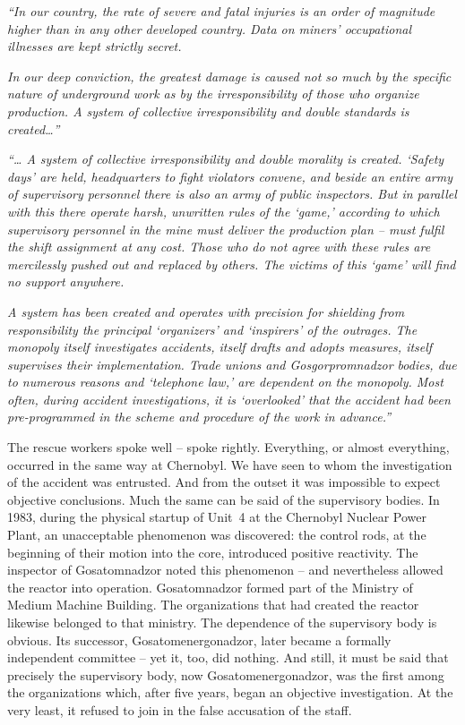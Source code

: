 \documentclass[openright]{bookest}
\begin{document}
\begin{personal}
\textit{``In our country, the rate of severe and fatal injuries is an order of magnitude higher than in any other developed country. Data on miners' occupational illnesses are kept strictly secret.}

\textit{In our deep conviction, the greatest damage is caused not so much by the specific nature of underground work as by the irresponsibility of those who organize production. A system of collective irresponsibility and double standards is created\ldots{}''}

\textit{``\ldots{} A system of collective irresponsibility and double morality is created. `Safety days' are held, headquarters to fight violators convene, and beside an entire army of supervisory personnel there is also an army of public inspectors. But in parallel with this there operate harsh, unwritten rules of the `game,' according to which supervisory personnel in the mine must deliver the production plan -- must fulfil the shift assignment at any cost. Those who do not agree with these rules are mercilessly pushed out and replaced by others. The victims of this `game' will find no support anywhere.}

\textit{A system has been created and operates with precision for shielding from responsibility the principal `organizers' and `inspirers' of the outrages. The monopoly itself investigates accidents, itself drafts and adopts measures, itself supervises their implementation. Trade unions and Gosgorpromnadzor bodies, due to numerous reasons and `telephone law,' are dependent on the monopoly. Most often, during accident investigations, it is `overlooked' that the accident had been pre-programmed in the scheme and procedure of the work in advance.''}
\end{personal}

The rescue workers spoke well -- spoke rightly. Everything, or almost everything, occurred in the same way at Chernobyl. We have seen to whom the investigation of the accident was entrusted. And from the outset it was impossible to expect objective conclusions. Much the same can be said of the supervisory bodies. In 1983, during the physical startup of Unit~4 at the Chernobyl Nuclear Power Plant, an unacceptable phenomenon was discovered: the control rods, at the beginning of their motion into the core, introduced positive reactivity. The inspector of Gosatomnadzor noted this phenomenon -- and nevertheless allowed the reactor into operation. Gosatomnadzor formed part of the Ministry of Medium Machine Building. The organizations that had created the reactor likewise belonged to that ministry. The dependence of the supervisory body is obvious. Its successor, Gosatomenergonadzor, later became a formally independent committee -- yet it, too, did nothing. And still, it must be said that precisely the supervisory body, now Gosatomenergonadzor, was the first among the organizations which, after five years, began an objective investigation. At the very least, it refused to join in the false accusation of the staff.
\end{document}
